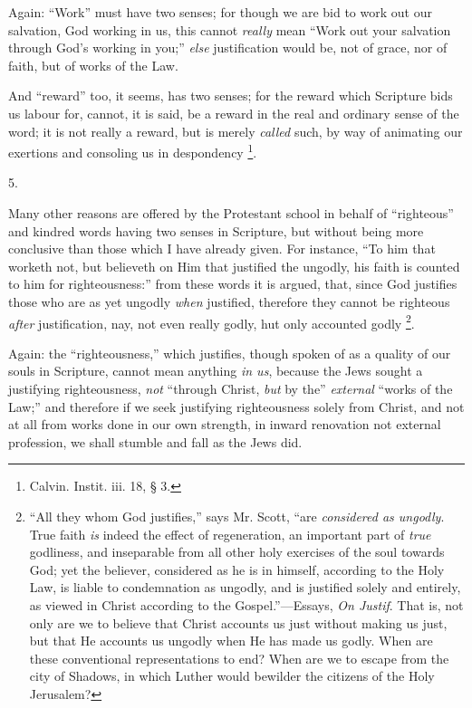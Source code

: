 Again: ``Work'' must have two senses; for though we are bid
to work out our salvation, God working in us, this cannot \emph{really}
mean ``Work out your salvation through God's working in you;''
\emph{else} justification would be, not of grace, nor of faith, but of
works of the Law.

And ``reward'' too, it seems, has two senses; for the
reward which Scripture bids us labour for, cannot, it is said, be a
reward in the real and ordinary sense of the word; it is not really a
reward, but is merely \emph{called} such, by way of animating our
exertions and consoling us in despondency \footnote{Calvin. Instit.
iii. 18, § 3.}.

5.

Many other reasons are offered by the Protestant school in behalf
of ``righteous'' and kindred words having two senses in
Scripture, but without being more conclusive than those which I have
already given. For instance, ``To him that worketh not, but
believeth on Him that justified the ungodly, his faith is counted to
him for righteousness:'' from these words it is argued, that,
since God justifies those who are as yet ungodly \emph{when}
justified, therefore they cannot be righteous \emph{after}
justification, nay, not even really godly, hut only accounted godly \footnote{``All they
whom God justifies,'' says Mr. Scott, ``are \emph{considered as
ungodly}. True faith \emph{is} indeed the effect of regeneration,
an important part of \emph{true} godliness, and inseparable from all
other holy exercises of the soul towards God; yet the believer,
considered as he is in himself, according to the Holy Law, is liable
to condemnation as ungodly, and is justified solely and entirely, as
viewed in Christ according to the Gospel.''—Essays, \emph{On Justif}.
That is, not only are we to believe that Christ accounts us just
without making us just, but that He accounts us ungodly when He has
made us godly. When are these conventional representations to end?
When are we to escape from the city of Shadows, in which Luther would
bewilder the citizens of the Holy Jerusalem?}.

Again: the ``righteousness,'' which justifies, though
spoken of as a quality of our souls in Scripture, cannot mean anything
\emph{in us}, because the Jews sought a justifying righteousness, \emph{not}
``through Christ, \emph{but} by the'' \emph{external}
``works of the Law;'' and therefore if we seek justifying
righteousness solely from Christ, and not at all from works done in
our own strength, in inward renovation not external profession, we
shall stumble and fall as the Jews did.

